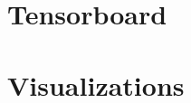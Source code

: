 \documentclass[../../fyp.tex]{subfiles}
\begin{document}
\section{Tensorboard}


\section{Visualizations}


\end{document}
